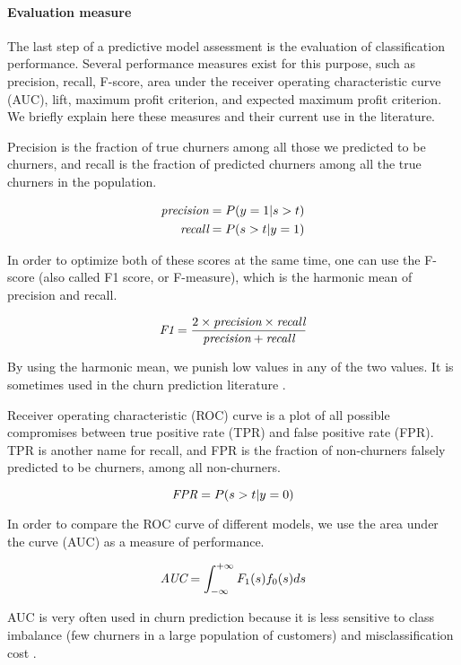 \paragraph{Evaluation measure} The last step of a predictive model assessment is
the evaluation of classification performance. Several performance measures exist
for this purpose, such as precision, recall, F-score, area under the receiver
operating characteristic curve (AUC), lift, maximum profit criterion, and
expected maximum profit criterion. We briefly explain here these measures and
their current use in the literature.

Precision is the fraction of true churners among all those we predicted to be
churners, and recall is the fraction of predicted churners among all the true
churners in the population.

\begin{align*}
    \textit{precision} &= P(y=1|s>t)\\
    \textit{recall}    &= P(s>t|y=1)
\end{align*}

In order to optimize both of these scores at the same time, one can use the
F-score (also called F1 score, or F-measure), which is the harmonic mean of
precision and recall.

\[\textit{F1} = \frac{2\times \textit{precision} \times \textit{recall}}{\textit{precision} + \textit{recall}}\]

By using the harmonic mean, we punish low values in any of the two values. It is
sometimes used in the churn prediction literature \parencite{ahmed2017churn,
keramati2014improved}.

Receiver operating characteristic (ROC) curve \parencite{krzanowski2009roc} is a
plot of all possible compromises between true positive rate (TPR) and false
positive rate (FPR). TPR is another name for recall, and FPR is the fraction of
non-churners falsely predicted to be churners, among all non-churners.

\[\textit{FPR}=P(s>t|y=0)\]

In order to compare the ROC curve of different models, we use the area under the
curve (AUC) as a measure of performance.

\[\textit{AUC}=\int_{-\infty}^{+\infty}F_1(s)f_0(s)ds\]

AUC is very often used in churn prediction \parencite{coussement2017comparative,
mitrovic2018operational} because it is less sensitive to class imbalance (few
churners in a large population of customers) and misclassification cost
\parencite{verbeke2012new}.

